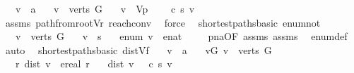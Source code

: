 \begin{isabellebody}
\ \ \ v\ {\isacharcolon}{\isacharcolon}\ {\isacharprime}a\isanewline
\ \ \ {\isachardoublequoteopen}v\ {\isasymin}\ verts\ G{\isachardoublequoteclose}\isanewline
\ \ \ {\isachardoublequoteopen}v\ {\isasymnotin}\ V\isactrlsub p{\isachardoublequoteclose}\isanewline
\ \ \ {\isachardoublequoteopen}{\isasymmu}\ c\ s\ v\ {\isasymnoteq}\ {\isasyminfinity}{\isachardoublequoteclose}\isanewline
%
\isadelimproof
\ \ %
\endisadelimproof
%
\isatagproof
{}\isamarkupfalse%
\ assms\ path{\isacharunderscore}from{\isacharunderscore}root{\isacharunderscore}Vr\ {\isasymmu}{\isacharunderscore}reach{\isacharunderscore}conv\ \isamarkupfalse%
\ force%
\endisatagproof
{\isafoldproof}%
%
\isadelimproof
\isanewline
%
\endisadelimproof
\isanewline
{}\isamarkupfalse%
\ {\isacharparenleft}\ shortest{\isacharunderscore}paths{\isacharunderscore}basic{\isacharparenright}\ enum{\isacharunderscore}not{}{\isacharcolon}\isanewline
\ \ \ {\isachardoublequoteopen}v\ {\isasymin}\ verts\ G{\isachardoublequoteclose}\isanewline
\ \ \ {\isachardoublequoteopen}v\ {\isasymnoteq}\ s{\isachardoublequoteclose}\isanewline
\ \ \ {\isachardoublequoteopen}enum\ v\ {\isasymnoteq}\ enat\ {}{\isachardoublequoteclose}\isanewline
%
\isadelimproof
\ \ %
\endisadelimproof
%
\isatagproof
{}\isamarkupfalse%
\ pna{\isacharbrackleft}OF\ assms{\isacharparenleft}{}{\isacharcomma}{}{\isacharparenright}{\isacharbrackright}\ assms\ \isamarkupfalse%
\ enum{\isacharunderscore}def\ \isamarkupfalse%
\ auto%
\endisatagproof
{\isafoldproof}%
%
\isadelimproof
\isanewline
%
\endisadelimproof
\isanewline
\isanewline
{}\isamarkupfalse%
\ {\isacharparenleft}\ shortest{\isacharunderscore}paths{\isacharunderscore}basic{\isacharparenright}\ dist{\isacharunderscore}Vf{\isacharunderscore}{\isasymmu}{\isacharcolon}\isanewline
\ \ \ v\ {\isacharcolon}{\isacharcolon}\ {\isacharprime}a\isanewline
\ \ \ vG{\isacharcolon}\ {\isachardoublequoteopen}v\ {\isasymin}\ verts\ G{\isachardoublequoteclose}\isanewline
\ \ \ {\isachardoublequoteopen}{\isasymexists}r{\isachardot}\ dist\ v\ {\isacharequal}\ ereal\ r{\isachardoublequoteclose}\isanewline
\ \ \ {\isachardoublequoteopen}dist\ v\ {\isacharequal}\ {\isasymmu}\ c\ s\ v{\isachardoublequoteclose}\isanewline

\end{isabellebody}
